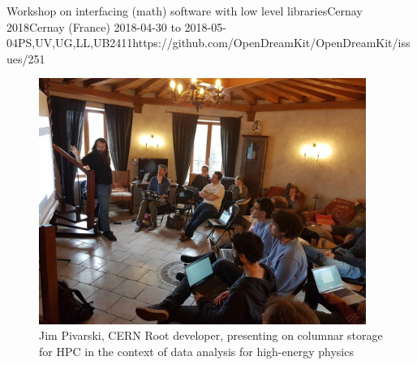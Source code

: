 \begin{event}{Workshop on interfacing (math) software with low level libraries}{Cernay 2018}{Cernay (France) 2018-04-30 to 2018-05-04}{PS,UV,UG,LL,UB}{24}{11}{https://github.com/OpenDreamKit/OpenDreamKit/issues/251}
  \begin{figure}[ht]
    \includegraphics[height=8cm]{2018-04-30-Cernay.jpg}
    \caption*{Jim Pivarski, CERN Root developer, presenting on columnar
      storage for HPC in the context of data analysis for high-energy
      physics}
  \end{figure}

\end{event}

